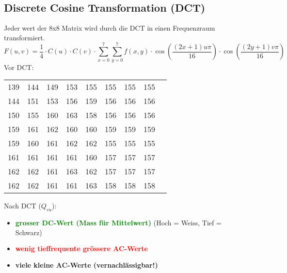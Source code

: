 \subsection{Discrete Cosine Transformation (DCT)}
Jeder wert der 8x8 Matrix wird durch die DCT in einen Frequenzraum transformiert.
\begin{equation*}
	F(u,v) = \frac{1}{4} \cdot C(u) \cdot C(v) \cdot \sum_{x=0}^{7} \sum_{y=0}^{7} f(x,y) \cdot \cos(\frac{(2x+1)u\pi}{16}) \cdot \cos(\frac{(2y+1)v\pi}{16})
\end{equation*}
Vor DCT:
\begin{center}
	\begin{tabular}{ c c c c c c c c c }
		139 & 144 & 149 & 153 & 155 & 155 & 155 & 155 \\
		144 & 151 & 153 & 156 & 159 & 156 & 156 & 156 \\
		150 & 155 & 160 & 163 & 158 & 156 & 156 & 156 \\
		159 & 161 & 162 & 160 & 160 & 159 & 159 & 159 \\
		159 & 160 & 161 & 162 & 162 & 155 & 155 & 155 \\
		161 & 161 & 161 & 161 & 160 & 157 & 157 & 157 \\
		162 & 162 & 161 & 163 & 162 & 157 & 157 & 157 \\
		162 & 162 & 161 & 161 & 163 & 158 & 158 & 158 \\
	\end{tabular}
\end{center}
Nach DCT ($Q_{vu}$):
\begin{itemize}
	\item \textbf{\textcolor{green}{grosser DC-Wert (Mass für Mittelwert)}} (Hoch = Weiss, Tief = Schwarz)
	\item \textbf{\textcolor{red}{wenig tieffrequente grössere AC-Werte}}
	\item \textbf{viele kleine AC-Werte (vernachlässigbar!)}
\end{itemize}
